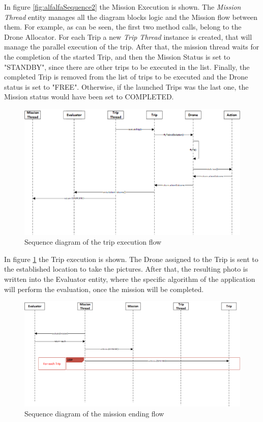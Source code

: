 In figure \ref{fig:alfalfaSequence2} the Mission Execution is shown.
The \textit{Mission Thread} entity manages all the diagram blocks logic and the Mission flow between them. For example, as can be seen, the first two method calls, belong to the Drone Allocator. 
For each Trip a new \textit{Trip Thread} instance is created, that will manage the parallel execution of the trip.
After that, the mission thread waits for the completion of the started Trip, and then the Mission Status is set to "STANDBY", since there are other trips to be executed in the list.
Finally, the completed Trip is removed from the list of trips to be executed and the Drone status is set to "FREE".
Otherwise, if the launched Trips was the last one, the Mission status would have been set to COMPLETED.
\\

 \begin{figure}[H]
   \centering
   \includegraphics[width=\linewidth]{pictures/Alfalfa_Sequence_TripExecution.png}
   \caption{Sequence diagram of the trip execution flow}
   \label{fig:alfalfaSequence3}
 \end{figure}

In figure \ref{fig:alfalfaSequence3} the Trip execution is shown.
The Drone assigned to the Trip is sent to the established location to take the pictures.
After that, the resulting photo is written into the Evaluator entity, where the specific algorithm of the application will perform the evaluation, once the mission will be completed.
\\

 \begin{figure}[H]
   \centering
   \includegraphics[width=\linewidth]{pictures/Alfalfa_Sequence_MissionEnd.png}
   \caption{Sequence diagram of the mission ending flow}
   \label{fig:alfalfaSequence4}
 \end{figure}


